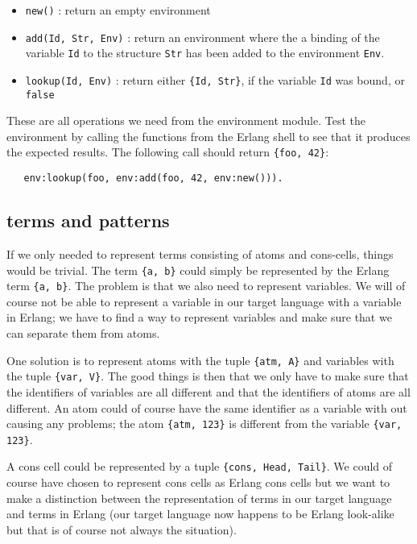 \documentclass[a4paper,11pt]{article}
\begin{document}
\begin{itemize}
\item {\tt new()} : return an empty environment

\item {\tt add(Id, Str, Env)} : return an environment where the a
  binding of the variable {\tt Id} to the structure {\tt Str} has been
  added to the environment {\tt Env}.

\item {\tt lookup(Id, Env)} : return either {\tt \{Id, Str\}}, if the
  variable {\tt Id} was bound, or {\tt false}

\end{itemize}

These are all operations we need from the environment module. Test the
environment by calling the functions from the Erlang shell to see that
it produces the expected results. The following
call should return {\tt \{foo,  42\}}:

\begin{verbatim}
   env:lookup(foo, env:add(foo, 42, env:new())).
\end{verbatim}

\subsection{terms and patterns}

If we only needed to represent terms consisting of atoms and
cons-cells, things would be trivial. The term {\tt \{a, b\}} could
simply be represented by the Erlang term {\tt \{a, b\}}.  The problem
is that we also need to represent variables. We will of
course not be able to represent a variable in our target language with
a variable in Erlang; we have to find a way to represent variables and
make sure that we can separate them from atoms.

One solution is to represent atoms with the tuple {\tt \{atm, A\}} and
variables with the tuple {\tt \{var, V\}}. The good things is then
that we only have to make sure that the identifiers of variables are
all different and that the identifiers of atoms are all different. An
atom could of course have the same identifier as a variable with out
causing any problems; the atom {\tt \{atm, 123\}} is different from
the variable {\tt \{var, 123\}}.

A cons cell could be represented by a tuple {\tt \{cons, Head,
  Tail\}}. We could of course have chosen to represent cons cells as
Erlang cons cells but we want to make a distinction between the
representation of terms in our target language and terms in Erlang (our
target language now happens to be Erlang look-alike but that is of
course not always the situation).
\end{document}
